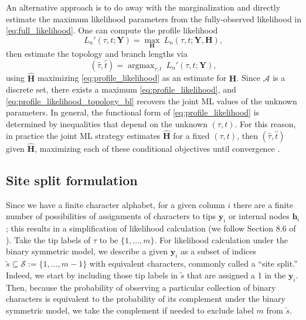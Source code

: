 \documentclass{article}
\newcommand{\alphabet}{\mathcal{A}}
\newcommand{\fullAlignment}{\mathbf{Y}}
\newcommand{\alignmentColumn}{\mathbf{y}}
\newcommand{\siteSplit}{\tilde{s}}
\newcommand{\siteSplitSet}{\mathcal{S}}
\newcommand{\fullAncestralStates}{\mathbf{H}}
\newcommand{\ancestralStateColumn}{\mathbf{h}}
\newcommand{\nCols}{n}
\newcommand{\nSiteRows}{m}
\DeclareMathOperator*{\argmax}{argmax}
\begin{document}
An alternative approach is to do away with the marginalization and directly estimate the maximum likelihood parameters from the fully-observed likelihood in \eqref{eq:full_likelihood}.
One can compute the profile likelihood
\begin{equation}
\label{eq:profile_likelihood}
L_\nCols'(\tau, t; \fullAlignment) = \max_{\fullAncestralStates} \ L_\nCols(\tau, t; \fullAlignment, \fullAncestralStates),
\end{equation}
then estimate the topology and branch lengths via
\begin{equation}
\label{eq:profile_likelihood_topology_bl}
(\hat{\tau}, \hat{t}) = \argmax_{\tau, t} \ L_\nCols'(\tau, t; \fullAlignment),
\end{equation}
using $\hat{\fullAncestralStates}$ maximizing \eqref{eq:profile_likelihood} as an estimate for $\fullAncestralStates$.
Since $\alphabet$ is a discrete set, there exists a maximum \eqref{eq:profile_likelihood}, and \eqref{eq:profile_likelihood_topology_bl} recovers the joint ML values of the unknown parameters.
In general, the functional form of \eqref{eq:profile_likelihood} is determined by inequalities that depend on the unknown $(\tau,t)$.
For this reason, in practice the joint ML strategy estimates $\hat{\fullAncestralStates}$ for a fixed $(\tau,t)$, then $(\hat{\tau},\hat{t})$ given $\hat{\fullAncestralStates}$, maximizing each of these conditional objectives until convergence \cite{Neher2017}.

\subsection{Site split formulation}

Since we have a finite character alphabet, for a given column $i$ there are a finite number of possibilities of assignments of characters to tips $\alignmentColumn_i$ or internal nodes $\ancestralStateColumn_i$; this results in a simplification of likelihood calculation (we follow Section 8.6 of \cite{Semple2003-em}).
Take the tip labels of $\tau$ to be $\{1,\ldots,\nSiteRows\}$.
For likelihood calculation under the binary symmetric model, we describe a given $\alignmentColumn_i$ as a subset of indices $\siteSplit\subseteq\siteSplitSet:=\{1,\ldots,\nSiteRows-1\}$ with equivalent characters, commonly called a ``site split.''
Indeed, we start by including those tip labels in $\siteSplit$ that are assigned a 1 in the $\alignmentColumn_i$.
Then, because the probability of observing a particular collection of binary characters is equivalent to the probability of its complement under the binary symmetric model, we take the complement if needed to exclude label $\nSiteRows$ from $\siteSplit$.
\end{document}
